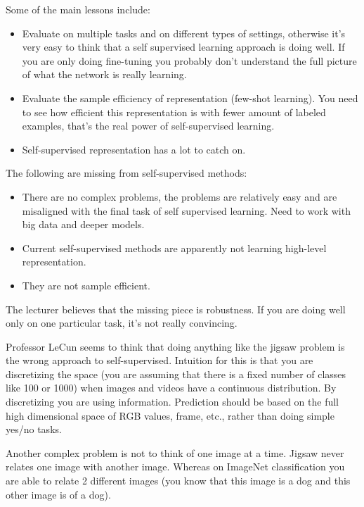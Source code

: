 Some of the main lessons include:
\begin{itemize}
\item Evaluate on multiple tasks and on different types of settings, otherwise it’s very easy to think that a self supervised learning approach is doing well. If you are only doing fine-tuning you probably don’t understand the full picture of what the network is really learning. 
\item Evaluate the sample efficiency of representation (few-shot learning). You need to see how efficient this representation is with fewer amount of labeled examples, that’s the real power of self-supervised learning.
\item Self-supervised representation has a lot to catch on.
\end{itemize}
The following are missing from self-supervised methods:
\begin{itemize}
\item There are no complex problems, the problems are relatively easy and are misaligned with the final task of self supervised learning. Need to work with big data and deeper models.
\item Current self-supervised methods are apparently not learning high-level representation.
\item They are not sample efficient.
\end{itemize}

The lecturer believes that the missing piece is robustness. If you are doing well only on one particular task, it’s not really convincing.

Professor LeCun seems to think that doing anything like the jigsaw problem is the wrong approach to self-supervised. Intuition for this is that you are discretizing the space (you are assuming that there is a fixed number of classes like 100 or 1000) when images and videos have a continuous distribution. By discretizing you are using information. Prediction should be based on the full high dimensional space of RGB values, frame, etc., rather than doing simple yes/no tasks. 

Another complex problem is not to think of one image at a time. Jigsaw never relates one image with another image. Whereas on ImageNet classification you are able to relate 2 different images (you know that this image is a dog and this other image is of a dog).

